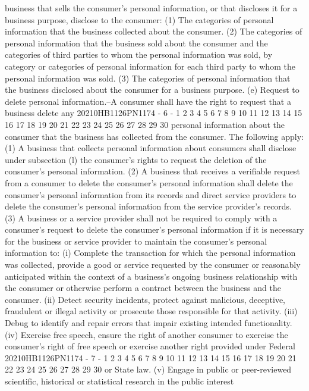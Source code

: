 business that sells the consumer's personal information, or that
discloses it for a business purpose, disclose to the consumer:
(1) The categories of personal information that the
business collected about the consumer.
(2) The categories of personal information that the
business sold about the consumer and the categories of third
parties to whom the personal information was sold, by
category or categories of personal information for each third
party to whom the personal information was sold.
(3) The categories of personal information that the
business disclosed about the consumer for a business purpose.
(e) Request to delete personal information.--A consumer
shall have the right to request that a business delete any
20210HB1126PN1174 - 6 -
1
2
3
4
5
6
7
8
9
10
11
12
13
14
15
16
17
18
19
20
21
22
23
24
25
26
27
28
29
30
personal information about the consumer that the business has
collected from the consumer. The following apply:
(1) A business that collects personal information about
consumers shall disclose under subsection (l) the consumer's
rights to request the deletion of the consumer's personal
information.
(2) A business that receives a verifiable request from a
consumer to delete the consumer's personal information shall
delete the consumer's personal information from its records
and direct service providers to delete the consumer's
personal information from the service provider's records.
(3) A business or a service provider shall not be
required to comply with a consumer's request to delete the
consumer's personal information if it is necessary for the
business or service provider to maintain the consumer's
personal information to:
(i) Complete the transaction for which the personal
information was collected, provide a good or service
requested by the consumer or reasonably anticipated
within the context of a business's ongoing business
relationship with the consumer or otherwise perform a
contract between the business and the consumer.
(ii) Detect security incidents, protect against
malicious, deceptive, fraudulent or illegal activity or
prosecute those responsible for that activity.
(iii) Debug to identify and repair errors that
impair existing intended functionality.
(iv) Exercise free speech, ensure the right of
another consumer to exercise the consumer's right of free
speech or exercise another right provided under Federal
20210HB1126PN1174 - 7 -
1
2
3
4
5
6
7
8
9
10
11
12
13
14
15
16
17
18
19
20
21
22
23
24
25
26
27
28
29
30
or State law.
(v) Engage in public or peer-reviewed scientific,
historical or statistical research in the public interest
